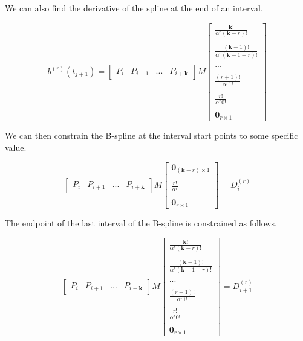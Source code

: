 \documentclass{article}
\begin{document}
We can also find the derivative of the spline at the end of an interval.

\begin{equation}
    b^{(r)}(t_{j+1}) = \begin{bmatrix} P_{i} & P_{i+1} & ... & P_{i+\textbf{k}}\end{bmatrix} M \begin{bmatrix}
    \frac{\textbf{k}!}{ \alpha^{r} (\textbf{k}-r)!} \\ \\ 
    \frac{ (\textbf{k}-1)!}{ \alpha^{r} (\textbf{k}-1-r)!} \\ \\ 
    ... \\ \\ 
    \frac{(r+1)!}{\alpha^{r} 1!} \\ \\ 
    \frac{r!}{\alpha^r 0!} \\ \\ 
    \textbf{0}_{r \times 1} \end{bmatrix}
\end{equation}

We can then constrain the B-spline at the interval start points to some specific value.

\begin{equation}
    \begin{bmatrix} P_{i} & P_{i+1} & ... & P_{i+\textbf{k}}\end{bmatrix} M \begin{bmatrix} \textbf{0}_{(\textbf{k}-r) \times 1} \\ \\ \frac{r!}{\alpha^r} \\ \\ \textbf{0}_{r \times 1} \end{bmatrix} = D_{i}^{(r)}
\end{equation}

The endpoint of the last interval of the B-spline is constrained as follows.

\begin{equation}
    \begin{bmatrix} P_{i} & P_{i+1} & ... & P_{i+\textbf{k}}\end{bmatrix} M \begin{bmatrix}
    \frac{\textbf{k}!}{ \alpha^{r} (\textbf{k}-r)!} \\ \\ 
    \frac{ (\textbf{k}-1)!}{ \alpha^{r} (\textbf{k}-1-r)!} \\ \\ 
    ... \\ \\ 
    \frac{(r+1)!}{\alpha^{r} 1!} \\ \\ 
    \frac{r!}{\alpha^r 0!} \\ \\ 
    \textbf{0}_{r \times 1} \end{bmatrix} = D_{i+1}^{(r)}
\end{equation}
\end{document}
